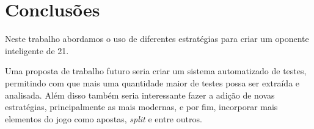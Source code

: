 \section{Conclusões}

    Neste trabalho abordamos o uso de diferentes estratégias para 
    criar um oponente inteligente de 21. 

    Uma proposta de trabalho futuro seria criar um sistema automatizado 
    de testes, permitindo com que mais uma quantidade maior de testes 
    possa ser extraída e analisada. Além disso também seria interessante 
    fazer a adição de novas estratégias, principalmente as mais modernas, 
    e por fim, incorporar mais elementos do jogo como apostas, \emph{split}
    e entre outros.